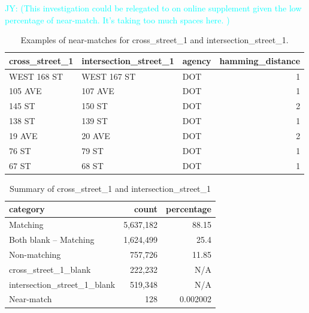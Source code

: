 \documentclass[linenumber]{jdsart}
\newcommand{\jy}[1]{\textcolor{cyan}{JY: (#1)}}
\begin{document}
\jy{This investigation could be relegated to on online supplement
  given the low percentage of near-match. It's taking too much spaces
  here.
}

\begin{table}[tbp]
    \centering
     \caption{Examples of near-matches for cross\_street\_1 and intersection\_street\_1.}
     \label{tab:x1nearmatches}
		\begin{tabular}{l l l r}
	        \toprule
	        \textbf{cross\_street\_1} & \textbf{intersection\_street\_1} 
	        & \textbf{agency} & \textbf{hamming\_distance} \\
	        \midrule
	        WEST 168 ST    & WEST 167 ST           & DOT    & 1 \\
	        105 AVE        & 107 AVE               & DOT    & 1 \\
	        145 ST         & 150 ST                & DOT    & 2 \\
	        138 ST         & 139 ST                & DOT    & 1 \\
	        19 AVE         & 20 AVE                & DOT    & 2 \\
	        76 ST          & 79 ST                 & DOT    & 1 \\
	        67 ST          & 68 ST                 & DOT    & 1 \\
	        \bottomrule
	    \end{tabular}
\end{table}

\begin{table}[tbp]
    \centering
    \caption{Summary of cross\_street\_1 and intersection\_street\_1}
    \label{tab:summary1}
	    \begin{tabular}{l r r}
	        \toprule
	        \textbf{category} & \textbf{count} & \textbf{percentage} \\
	        \midrule
	        Matching                    & 5,637,182 & 88.15     \\
	        Both blank -- Matching      & 1,624,499 & 25.4      \\
	        Non-matching                &   757,726 & 11.85     \\
	        cross\_street\_1\_blank     &   222,232 & N/A       \\
	        intersection\_street\_1\_blank &   519,348 & N/A       \\
	        Near-match                  &       128 & 0.002002  \\
	        \bottomrule
	    \end{tabular}
\end{table}
\end{document}
